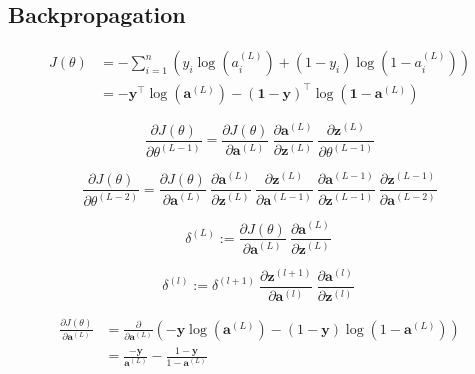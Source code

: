 \documentclass{article}
\begin{document}
    \subsection{Backpropagation}
        
        
        $$ \begin{aligned}
        J(\theta) &= - \sum_{i=1}^{n} \left( y_i \log(a^{(L)}_i) + (1 - y_i) \log(1 - a^{(L)}_i) \right) \\
            &= -\mathbf{y}^\top \log(\mathbf{a}^{(L)}) - (\mathbf{1}-\mathbf{y})^\top \log(\mathbf{1} - \mathbf{a}^{(L)})
        \end{aligned} $$
        
        
        
        $$
        \frac{\partial J(\theta)}{\partial \theta^{(L-1)}} =
            \frac{\partial J(\theta)}{\partial \mathbf{a}^{(L)}} \
            \frac{\partial \mathbf{a}^{(L)}}{\partial \mathbf{z}^{(L)}} \
            \frac{\partial \mathbf{z}^{(L)}}{\partial \theta^{(L-1)}}
        $$



        $$
        \frac{\partial J(\theta)}{\partial \theta^{(L-2)}} =
            \frac{\partial J(\theta)}{\partial \mathbf{a}^{(L)}} \
            \frac{\partial \mathbf{a}^{(L)}}{\partial \mathbf{z}^{(L)}} \
            \frac{\partial \mathbf{z}^{(L)}}{\partial \mathbf{a}^{(L-1)}} \
            \frac{\partial \mathbf{a}^{(L-1)}}{\partial \mathbf{z}^{(L-1)}} \
            \frac{\partial \mathbf{z}^{(L-1)}}{\partial \mathbf{a}^{(L-2)}}
        $$



        $$
        \delta^{(L)} :=
            \frac{\partial J(\theta)}{\partial \mathbf{a}^{(L)}} \
            \frac{\partial \mathbf{a}^{(L)}}{\partial \mathbf{z}^{(L)}} \
        $$
        
        
        
        
        $$
        \delta^{(l)} :=
            \delta^{(l+1)} \
            \frac{\partial \mathbf{z}^{(l+1)}}{\partial \mathbf{a}^{(l)}} \
            \frac{\partial \mathbf{a}^{(l)}}{\partial \mathbf{z}^{(l)}} \
        $$
        
        
        
        
        $$ \begin{aligned}
        \frac{\partial J(\theta)}{\partial \mathbf{a}^{(L)}}
            &= \frac{\partial}{\partial \mathbf{a}^{(L)}}
               \left( -\mathbf{y} \log(\mathbf{a}^{(L)}) - (1-\mathbf{y}) \log(1 - \mathbf{a}^{(L)}) \right) \\
            &= \frac{-\mathbf{y}}{\mathbf{a}^{(L)}} - \frac{1 - \mathbf{y}}{1 - \mathbf{a}^{(L)}}
        \end{aligned} $$
        
\end{document}
